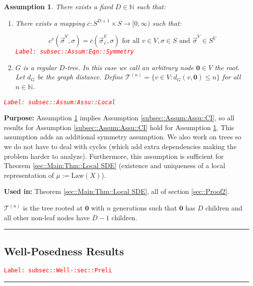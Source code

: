 \documentclass[12pt]{article}
\newcommand{\mb}{\mathbb}
\newcommand{\mc}{\mathcal}
\newcommand{\ra}{\rightarrow}
\newcommand{\ov}{\overline}
\newcommand{\te}{\text}
\newcommand{\tr}{\textcolor{red}}
\newcommand{\labe}[1]{\tr{\texttt{Label: #1}}}
\newcommand{\purpose}{\textbf{Purpose: }}
\newcommand{\usein}{\textbf{Used in: }}
\newcommand{\ind}{\hspace{24pt}}
\newcommand{\lin}{\rule{\linewidth}{0.4 pt}}
\newcommand{\defeq}{:=}								%
\renewcommand{\root}{\mathbf{0}}				%
\renewcommand{\v}{v}							%
\renewcommand{\S}{S}							%
\newcommand{\s}{\sigma}							%
\newcommand{\sv}{\vec{\s}}						%
\newcommand{\X}{X}								%
\newcommand{\IGr}{c}							%
\newcommand{\vind}[1]{^{#1}}					%
\newcommand{\carp}[1]{^{#1}}					%
\newcommand{\vsi}[1]{^{#1}}						%
\newcommand{\cind}[1]{_{#1}}					%
\newcommand{\cl}{\ov}							%
\newcommand{\degr}{D}							%
\newcommand{\IGrg}{\ov{c}}						%
\newcommand{\gdist}{d_G}						%
\newcommand{\tree}{\mc{T}}						%
\newcommand{\sln}[1]{^{(#1)}}					%
\newcommand{\m}{\mu}							%
\newcommand{\law}{\te{Law}}						%
\newtheorem{assu}[thms]{Assumption}
\begin{document}
\begin{assu}
There exists a fixed \(\degr\in \mb{N}\) such that:

\begin{enumerate}
\item There exists a mapping \(\IGrg: \S\carp{\degr+1} \times \S \ra [0,\infty)\) such that:

\begin{equation}
\IGr\vind{\v}(\sv\vsi{V},\s) = \IGrg(\sv\cind{\cl{\v}}\vsi{V},\s) \te{ for all } \v\in V, \s\in \S\te{ and } \sv\vsi{V} \in \S\carp{V}
\label{subsec::Assum:Eqn::Symmetry}
\end{equation}
\labe{subsec::Assum:Eqn::Symmetry}

\item \(G\) is a regular \(\degr\)-tree. In this case we call an arbitrary node \(\root\in V\) the root. Let \(\gdist\) be the graph distance. Define \(\tree\sln{n} = \{\v \in V: \gdist(\v,\root) \leq n\}\) for all \(n\in \mb{N}\).
\end{enumerate}
\label{subsec::Assum:Assu::Local}\labe{subsec::Assum:Assu::Local}
\end{assu}

\purpose Assumption \ref{subsec::Assum:Assu::Local} implies Assumption \ref{subsec::Assum:Assu::CI}, so all results for Assumption \ref{subsec::Assum:Assu::CI} hold for Assumption \ref{subsec::Assum:Assu::Local}. This assumption adds an additional symmetry assumption. We also work on trees so we do not have to deal with cycles (which add extra dependencies making the problem harder to analyze). Furthermore, this assumption is sufficient for Theorem \ref{sec::Main:Thm::Local SDE} (existence and uniqueness of a local representation of \(\m \defeq \law(\X)\)).

\usein Theorem \ref{sec::Main:Thm::Local SDE}, all of section \ref{sec::Proof2}.

\ind \(\tree\sln{n}\) is the tree rooted at \(\root\) with \(n\) generations such that \(\root\) has \(\degr\) children and all other non-leaf nodes have \(\degr-1\) children.

\lin

\subsection{Well-Posedness Results}
\label{subsec::Well-:sec::Preli}\labe{subsec::Well-:sec::Preli}

\rule{\linewidth}{0.4 pt}
\end{document}
